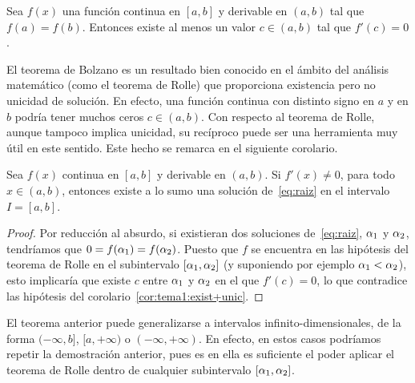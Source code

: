 \begin{theorem}[Rolle]
  \label{thm:rolle}
  Sea $f(x)$ una función continua en $[a, b]$ y derivable en
  $(a, b)$ tal que $f(a) = f(b)$.
  Entonces existe al menos un valor $c \in (a, b)$ tal que $f'(c) = 0$.
\end{theorem}

El teorema de Bolzano es un resultado bien conocido en el ámbito del
análisis matemático (como el teorema de Rolle) que proporciona
existencia pero no unicidad de solución. En efecto, una función
continua con distinto signo en $a$ y en $b$ podría tener muchos ceros
$c\in (a,b)$. Con respecto al teorema de Rolle, aunque tampoco implica
unicidad, su recíproco puede ser una herramienta muy útil en este
sentido. Este hecho se remarca en el siguiente
corolario.



\begin{corollary}
  \label{cor:tema1:exist+unic}
  Sea $f(x)$ continua en $[a, b]$ y derivable en $(a, b)$. Si
  $f'(x)\ne 0$, para todo $x\in (a, b)$, entonces existe a lo sumo una
  solución de~\eqref{eq:raiz} en el intervalo $I=[a,b]$.
\end{corollary}

\begin{proof}
  Por reducción al absurdo, si existieran dos soluciones
  de~\eqref{eq:raiz}, $\alpha_1$ y $\alpha_2$, tendríamos que
  $0=f(\alpha_1)=f(\alpha_2)$.  Puesto que $f$ se encuentra en las
  hipótesis del teorema de Rolle en el subintervalo
  $[\alpha_1,\alpha_2]$ (y suponiendo por ejemplo $\alpha_1<\alpha_2$), esto
  implicaría que existe $c$ entre $\alpha_1$ y $\alpha_2$ en el que
  $f'(c)=0$, lo que contradice las hipótesis del
  corolario~\ref{cor:tema1:exist+unic}.
\end{proof}

\begin{remark}
  \label{rk:tema1:exist+unic}
  El teorema anterior puede generalizarse a intervalos
  infinito-dimensionales, de la forma $(-\infty,b]$, $[a,+\infty)$ o
  $(-\infty,+\infty)$. En efecto, en estos casos podríamos repetir la
  demostración anterior, pues es en ella es suficiente el poder
  aplicar el teorema de Rolle dentro de cualquier subintervalo
  $[\alpha_1,\alpha_2]$.
\end{remark}

